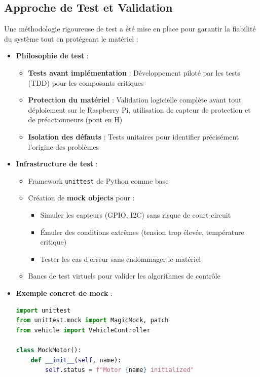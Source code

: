 \documentclass[a4paper, 12pt]{article}
\begin{document}
	\subsection{Approche de Test et Validation}
	
	Une méthodologie rigoureuse de test a été mise en place pour garantir la fiabilité du système tout en protégeant le matériel :
	
	\begin{itemize}
		\item \textbf{Philosophie de test} :
		\begin{itemize}
			\item \textbf{Tests avant implémentation} : Développement piloté par les tests (TDD) pour les composants critiques
			\item \textbf{Protection du matériel} : Validation logicielle complète avant tout déploiement sur le Raspberry Pi, utilisation de capteur de protection et de préactionneurs (pont en H)
			\item \textbf{Isolation des défauts} : Tests unitaires pour identifier précisément l'origine des problèmes
		\end{itemize}
		
		\item \textbf{Infrastructure de test} :
		\begin{itemize}
			\item Framework \texttt{unittest} de Python comme base
			\item Création de \textbf{mock objects} pour :
			\begin{itemize}
				\item Simuler les capteurs (GPIO, I2C) sans risque de court-circuit
				\item Émuler des conditions extrêmes (tension trop élevée, température critique)
				\item Tester les cas d'erreur sans endommager le matériel
			\end{itemize}
			\item Bancs de test virtuels pour valider les algorithmes de contrôle
		\end{itemize}
		
		\item \textbf{Exemple concret de mock} :
		\begin{lstlisting}[language=Python]
import unittest
from unittest.mock import MagicMock, patch
from vehicle import VehicleController

class MockMotor():
	def __init__(self, name):
		self.status = f"Motor {name} initialized"


\end{lstlisting}
\end{itemize}
\end{document}
